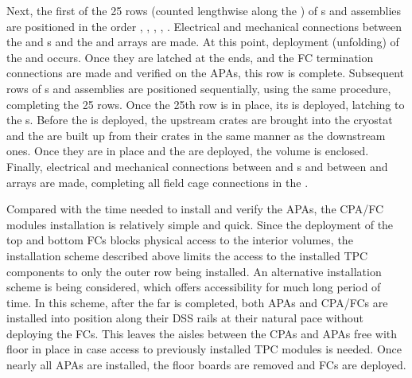 Next, the first of the 25 rows (counted lengthwise along the ) of s and  assemblies are positioned in the order , , , , .  Electrical and mechanical connections between the  and s and the  and  arrays are made.  At this point, deployment (unfolding) of the  and  %
occurs.  Once they %
are latched at the  ends, and the FC termination connections are made and verified on the APAs, this  row is complete.  Subsequent rows of s and  assemblies are positioned sequentially, using the same procedure, completing the 25 rows. %
Once the 25th row is in place, its  %
is deployed, latching to the s.  Before the  is deployed, the upstream  crates are brought into the cryostat 
and the  are built up from their crates in the same manner as the downstream ones. %
Once they %
are in place and the  are deployed, the  volume is enclosed. %
Finally, electrical and mechanical connections between  and s and between  and  arrays are made, completing all field cage connections in the .

Compared with the time needed to install and verify the APAs, the CPA/FC modules installation is relatively simple and quick.  Since the deployment of the top and bottom FCs blocks physical access to the interior volumes, the installation scheme described above limits the access to the installed TPC components to only the outer row being installed.  An alternative installation scheme is being considered, which offers accessibility for much long period of time.  In this scheme, after the far  is completed, both APAs and CPA/FCs are installed into position along their DSS rails at their natural pace without deploying the FCs. This leaves the aisles between the CPAs and APAs free with floor in place in case access to previously installed TPC modules is needed.  Once nearly all APAs are installed, the floor boards are removed and FCs are deployed.   





